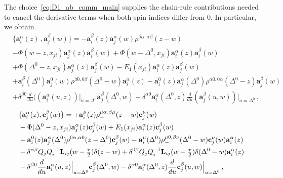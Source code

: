 The choice~\eqref{eq:D1_ab_comm_main} supplies the chain-rule contributions needed to cancel the derivative terms when both spin indices differ from $0$. In particular, we obtain
\begin{equation}
\label{eq:aa_main_xD1_dyn}
\begin{split}
&\{\mathbf{a}_i^\alpha(z) \,,\mathbf{a}_j^\beta(w) \}=- \mathbf{a}_i^\beta(z)\mathbf{a}_j^\alpha(w) \rho^{\beta \alpha, \alpha \beta}(z-w)\\
&  -  \Phi(w-z, x_{ji})\mathbf{a}_j^\alpha(z) \mathbf{a}_i^\beta(w) +  \Phi(w-\Delta^0, x_{ji})\mathbf{a}_i^\alpha(z) \mathbf{a}_i^\beta(w)\\
&+  \Phi(\Delta^0-z, x_{ji})\mathbf{a}_j^\alpha(z) \mathbf{a}_j^\beta(w)- E_1(x_{ji})\mathbf{a}_i^\alpha(z) \mathbf{a}_j^\beta(w)\\
&+\mathbf{a}_i^\beta (\Delta^0)\mathbf{a}_j^0(w)   \rho^{\beta 0, 0 \beta}(\Delta^0-w) \mathbf{a}_i^\alpha(z)- \mathbf{a}_i^0 (z)\mathbf{a}_j^\alpha(\Delta^0)   \rho^{\alpha 0,0 \alpha}(\Delta^0-z) \mathbf{a}_j^\beta(w)\\
&+ \delta^{\beta0} \frac{d}{du} ((\mathbf{a}_i^\alpha(u,z) )\Bigr|_{u=\Delta^0}   \mathbf{a}_j^\beta(\Delta^0,w)- \delta^{\alpha0} \mathbf{a}_i^\alpha(\Delta^0,z) \frac{d}{du} (\mathbf{a}_j^\beta(u,w) )\Bigr|_{u=\Delta^0}  \,,
\end{split}
\end{equation}
\begin{equation}
\label{eq:ab_main_xD1_dyn}
\begin{split}
&\{\mathbf{a}_i^\alpha(z), \mathbf{c}_j^\beta(w)\}=+\mathbf{a}_i^\mu(z) \rho_-^{\mu \alpha, \beta \mu}(z-w) \mathbf{c}_j^\mu(w)\\
&- \Phi(\Delta^0-z, x_{ji})   \mathbf{a}_j^\alpha(z) \mathbf{c}_j^\beta(w) + E_1(x_{ji}) \mathbf{a}_i^\alpha(z) \mathbf{c}_j^\beta(w)\\
&-  \mathbf{a}_i^0 (z)\mathbf{a}_j^\alpha(\Delta^0) \rho^{0 \alpha, \alpha 0}(z-\Delta^0) \mathbf{c}_j^\beta(w) -\mathbf{a}_i^\mu(\Delta^0) \rho_-^{\mu 0, \beta \nu}(\Delta^0-w) \mathbf{c}_j^\nu(w) \mathbf{a}_i^\alpha(z)\\
&-\delta^{\alpha\beta} Q_j Q^{-1}_i  \mathbf{L}_{ij}(w-\tfrac{\tau}{2}) \delta(z-w)+\delta^{0\beta} Q_j Q^{-1}_i  \mathbf{L}_{ij}(w-\tfrac{\tau}{2}) \delta(\Delta^0-w)\mathbf{a}_i^\alpha(z)\\
&- \delta^{\beta0}  \frac{d}{du} \mathbf{a}_i^\alpha(u,z)\Bigl|_{u=\Delta^0} \mathbf{c}_j^\beta(\Delta^0 ,w) - \delta^{\alpha0} \mathbf{a}_i^\alpha(\Delta^0 ,z) \frac{d}{du} \mathbf{c}_j^\beta(u,w)\Bigl|_{u=\Delta^0}  \,,
\end{split}
\end{equation}
